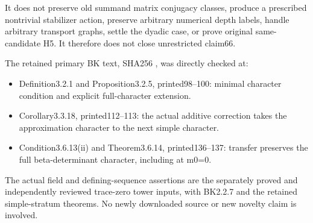 It does not preserve old summand matrix conjugacy classes, produce a
prescribed nontrivial stabilizer action, preserve arbitrary numerical
depth labels, handle arbitrary transport graphs, settle the dyadic case,
or prove original same-candidate H5. It therefore does not close
unrestricted claim66.

The retained primary BK text, SHA256
,
was directly checked at:

\begin{itemize}
\tightlist
\item
  Definition3.2.1 and Proposition3.2.5, printed98--100: minimal
  character condition and explicit full-character extension.
\item
  Corollary3.3.18, printed112--113: the actual additive correction takes
  the approximation character to the next simple character.
\item
  Condition3.6.13(ii) and Theorem3.6.14, printed136--137: transfer
  preserves the full beta-determinant character, including at m0=0.
\end{itemize}

The actual field and defining-sequence assertions are the separately
proved and independently reviewed trace-zero tower inputs, with BK2.2.7
and the retained simple-stratum theorems. No newly downloaded source or
new novelty claim is involved.
